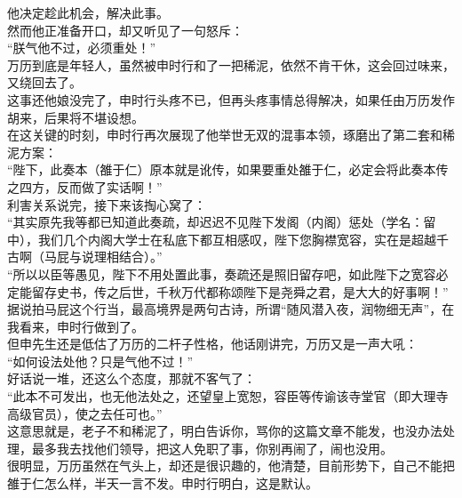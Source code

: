 \begin{multicols}{\theparacolNo}
他决定趁此机会，解决此事。\\

然而他正准备开口，却又听见了一句怒斥：\\

“朕气他不过，必须重处！”\\

万历到底是年轻人，虽然被申时行和了一把稀泥，依然不肯干休，这会回过味来，又绕回去了。\\

这事还他娘没完了，申时行头疼不已，但再头疼事情总得解决，如果任由万历发作胡来，后果将不堪设想。\\

在这关键的时刻，申时行再次展现了他举世无双的混事本领，琢磨出了第二套和稀泥方案：\\

“陛下，此奏本（雒于仁）原本就是讹传，如果要重处雒于仁，必定会将此奏本传之四方，反而做了实话啊！”\\

利害关系说完，接下来该掏心窝了：\\

“其实原先我等都已知道此奏疏，却迟迟不见陛下发阁（内阁）惩处（学名：留中），我们几个内阁大学士在私底下都互相感叹，陛下您胸襟宽容，实在是超越千古啊（马屁与说理相结合）。”\\

“所以以臣等愚见，陛下不用处置此事，奏疏还是照旧留存吧，如此陛下之宽容必定能留存史书，传之后世，千秋万代都称颂陛下是尧舜之君，是大大的好事啊！”\\

据说拍马屁这个行当，最高境界是两句古诗，所谓“随风潜入夜，润物细无声”，在我看来，申时行做到了。\\

但申先生还是低估了万历的二杆子性格，他话刚讲完，万历又是一声大吼：\\

“如何设法处他？只是气他不过！”\\

好话说一堆，还这么个态度，那就不客气了：\\

“此本不可发出，也无他法处之，还望皇上宽恕，容臣等传谕该寺堂官（即大理寺高级官员），使之去任可也。”\\

这意思就是，老子不和稀泥了，明白告诉你，骂你的这篇文章不能发，也没办法处理，最多我去找他们领导，把这人免职了事，你别再闹了，闹也没用。\\

很明显，万历虽然在气头上，却还是很识趣的，他清楚，目前形势下，自己不能把雒于仁怎么样，半天一言不发。申时行明白，这是默认。\\


\end{multicols}
